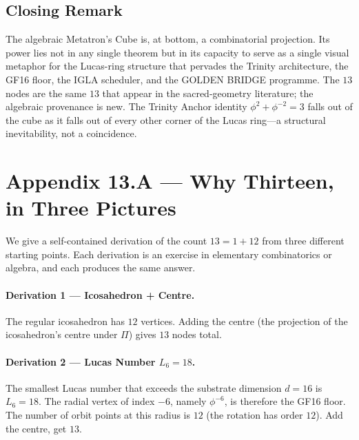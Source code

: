 \subsection{Closing Remark}
\label{fa_13:sec:13-closing-remark}

The algebraic Metatron's Cube is, at bottom, a combinatorial
projection. Its power lies not in any single theorem but in its
capacity to serve as a single visual metaphor for the Lucas-ring
structure that pervades the Trinity architecture, the GF16 floor, the
IGLA scheduler, and the GOLDEN BRIDGE programme. The $13$ nodes are
the same $13$ that appear in the sacred-geometry literature; the
algebraic provenance is new. The Trinity Anchor identity
$\phi^{2} + \phi^{-2} = 3$ falls out of the cube as it falls out of
every other corner of the Lucas ring---a structural inevitability, not
a coincidence.


\section*{Appendix 13.A --- Why Thirteen, in Three Pictures}
\label{sec:13-appA}

We give a self-contained derivation of the count $13 = 1 + 12$ from
three different starting points. Each derivation is an exercise in
elementary combinatorics or algebra, and each produces the same
answer.

\paragraph{Derivation 1 --- Icosahedron + Centre.}
The regular icosahedron has $12$ vertices. Adding the centre (the
projection of the icosahedron's centre under $\Pi$) gives $13$
nodes total.

\paragraph{Derivation 2 --- Lucas Number $L_{6} = 18$.}
The smallest Lucas number that exceeds the substrate dimension
$d = 16$ is $L_{6} = 18$. The radial vertex of index $-6$, namely
$\phi^{-6}$, is therefore the GF16 floor. The number of orbit
points at this radius is $12$ (the rotation has order $12$). Add
the centre, get $13$.

